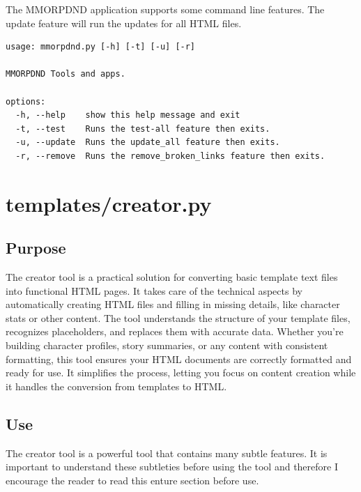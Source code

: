 The MMORPDND application supports some command line features. The update feature will run the updates for all HTML files.

\begin{lstlisting}
usage: mmorpdnd.py [-h] [-t] [-u] [-r]

MMORPDND Tools and apps.

options:
  -h, --help    show this help message and exit
  -t, --test    Runs the test-all feature then exits.
  -u, --update  Runs the update_all feature then exits.
  -r, --remove  Runs the remove_broken_links feature then exits.
\end{lstlisting}

















\section{templates/creator.py}



\subsection{Purpose}

The creator tool is a practical solution for converting basic template text files into functional HTML pages. It takes care of the technical aspects by automatically creating HTML files and filling in missing details, like character stats or other content. The tool understands the structure of your template files, recognizes placeholders, and replaces them with accurate data. Whether you're building character profiles, story summaries, or any content with consistent formatting, this tool ensures your HTML documents are correctly formatted and ready for use. It simplifies the process, letting you focus on content creation while it handles the conversion from templates to HTML.

\subsection{Use}

The creator tool is a powerful tool that contains many subtle features. It is important to understand these subtleties before using the tool and therefore I encourage the reader to read this enture section before use. 

